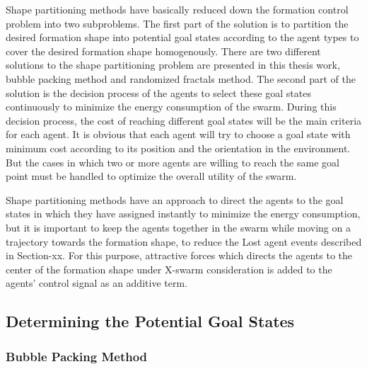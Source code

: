 \documentclass[twoside]{article}
\begin{document}
			Shape partitioning methods have basically reduced down the formation control problem into two subproblems. The first part of the solution is to partition the desired formation shape into potential goal states according to the agent types to cover the desired formation shape homogenously. There are two different solutions to the shape partitioning problem are presented in this thesis work, bubble packing method and randomized fractals method. The second part of the solution is the decision process of the agents to select these goal states continuously to minimize the energy consumption of the swarm. During this decision process, the cost of reaching different goal states will be the main criteria for each agent. It is obvious that each agent will try to choose a goal state with minimum cost according to its position and the orientation in the environment. But the cases in which two or more agents are willing to reach the same goal point must be handled to optimize the overall utility of the swarm. 


Shape partitioning methods have an approach to direct the agents to the goal states in which they have assigned instantly to minimize the energy consumption, but it is important to keep the agents together in the swarm while moving on a trajectory towards the formation shape, to reduce the Lost agent events described in Section-xx. For this purpose, attractive forces which directs the agents to the center of the formation shape under X-swarm consideration is added to the agents' control signal as an additive term. 
			
			\subsection{Determining the Potential Goal States}
			\subsubsection{Bubble Packing Method}
			
\end{document}
